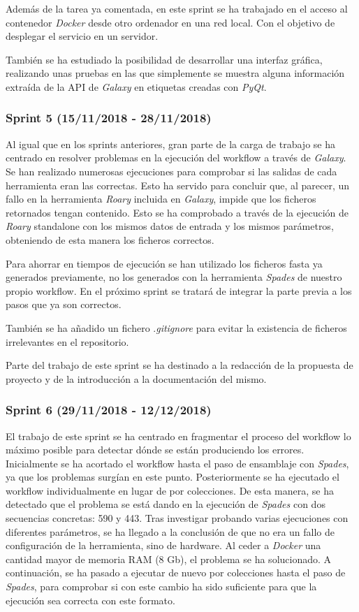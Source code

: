 Además de la tarea ya comentada, en este sprint se ha trabajado en el acceso al contenedor \textit{Docker} desde otro ordenador en una red local. Con el objetivo de desplegar el servicio en un servidor.

También se ha estudiado la posibilidad de desarrollar una interfaz gráfica, realizando unas pruebas en las que simplemente se muestra alguna información extraída de la API de \textit{Galaxy} en etiquetas creadas con \textit{PyQt}.

\subsubsection{Sprint 5 (15/11/2018 - 28/11/2018)}
Al igual que en los sprints anteriores, gran parte de la carga de trabajo se ha centrado en resolver problemas en la ejecución del workflow a través de \textit{Galaxy}. Se han realizado numerosas ejecuciones para comprobar si las salidas de cada herramienta eran las correctas. Esto ha servido para concluir que, al parecer, un fallo en la herramienta \textit{Roary} incluida en \textit{Galaxy}, impide que los ficheros retornados tengan contenido. Esto se ha comprobado a través de la ejecución de \textit{Roary} standalone con los mismos datos de entrada y los mismos parámetros, obteniendo de esta manera los ficheros correctos.

Para ahorrar en tiempos de ejecución se han utilizado los ficheros fasta ya generados previamente, no los generados con la herramienta \textit{Spades} de nuestro propio workflow. En el próximo sprint se tratará de integrar la parte previa a los pasos que ya son correctos.

También se ha añadido un fichero .\textit{gitignore} para evitar la existencia de ficheros irrelevantes en el repositorio.

Parte del trabajo de este sprint se ha destinado a la redacción de la propuesta de proyecto y de la introducción a la documentación del mismo.

\subsubsection{Sprint 6 (29/11/2018 - 12/12/2018)}
El trabajo de este sprint se ha centrado en fragmentar el proceso del workflow lo máximo posible para detectar dónde se están produciendo los errores.
Inicialmente se ha acortado el workflow hasta el paso de ensamblaje con \textit{Spades}, ya que los problemas surgían en este punto. Posteriormente se ha ejecutado el workflow individualmente en lugar de por colecciones. De esta manera, se ha detectado que el problema se está dando en la ejecución de \textit{Spades} con dos secuencias concretas: 590 y 443. Tras investigar probando varias ejecuciones con diferentes parámetros, se ha llegado a la conclusión de que no era un fallo de configuración de la herramienta, sino de hardware. Al ceder a \textit{Docker} una cantidad mayor de memoria RAM (8 Gb), el problema se ha solucionado. 
A continuación, se ha pasado a ejecutar de nuevo por colecciones hasta el paso de \textit{Spades}, para comprobar si con este cambio ha sido suficiente para que la ejecución sea correcta con este formato. 

